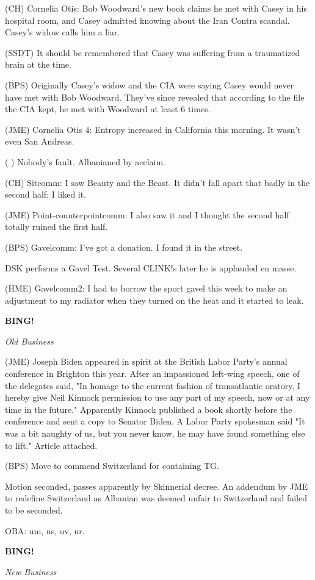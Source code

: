 \documentclass[12pt]{article}
\newcommand{\bing}{{\bf BING!} }
\newcommand{\goto}[1]{\bing \vskip 12pt \centerline{{\em{#1}}}}
\begin{document}
(CH) Cornelia Otis: Bob Woodward's new book claims he met with Casey in his hospital room, and Casey admitted knowing about the Iran Contra scandal. Casey's widow calls him a liar.

(SSDT) It should be remembered that Casey was suffering from a traumatized brain at the time.

(BPS) Originally Casey's widow and the CIA were saying Casey would never have met with Bob Woodward. They've since revealed that according to the file the CIA kept, he met with Woodward at least 6 times.

(JME) Cornelia Otis 4: Entropy increased in California this morning. It wasn't even San Andreas.

(  ) Nobody's fault. Albanianed by acclaim.

(CH) Sitcomm: I saw Beauty and the Beast. It didn't fall apart that badly in the second half; I liked it.

(JME) Point-counterpointcomm: I also saw it and I thought the second half totally ruined the first half.

(BPS) Gavelcomm: I've got a donation. I found it in the street.

DSK performs a Gavel Test. Several CLINK!s later he is applauded en masse.

(HME) Gavelcomm2: I had to borrow the sport gavel this week to make an adjustment to my radiator when they turned on the heat and it started to leak.

\goto{Old Business}

(JME) Joseph Biden appeared in spirit at the British Labor Party's annual conference in Brighton this year. After an impassioned left-wing speech, one of the delegates said, "In homage to the current fashion of transatlantic oratory, I hereby give Neil Kinnock permission to use any part of my speech, now or at any time in the future." Apparently Kinnock published a book shortly before the conference and sent a copy to Senator Biden. A Labor Party spokesman said "It was a bit naughty of us, but you never know, he may have found something else to lift." Article attached.

(BPS) Move to commend Switzerland for containing TG.

Motion seconded, passes apparently by Skinnerial decree. An addendum by JME to redefine Switzerland as Albanian was deemed unfair to Switzerland and failed to be seconded.

OBA: um, us, uv, ur.

\goto{New Business}
\end{document}
